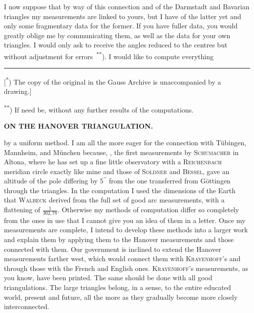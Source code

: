\par\noindent\hspace*{\parindent}I now suppose that by way of this connection and of the Darmstadt and Bavarian triangles my measurements are linked to yours, but I have  of the latter yet and only some fragmentary data for the former.
If you have fuller data, you would greatly oblige me by communicating them, as well as the data for your own triangles.
I would only ask to receive the angles reduced to the centres but without adjustment for errors~\textsuperscript{**}).
I would like to compute everything
\par\smallskip\noindent\rule{.24\textwidth}{.4pt}\par\smallskip
{\footnotesize
\noindent\hspace*{1.5em}[\textsuperscript{*}) The copy of the original in the Gauss Archive is unaccompanied by a drawing.]\par
\noindent\hspace*{1.5em}\textsuperscript{**}) If need be, without any further results of the computations.\par
}
\clearpage
\noindent\null\hfill{\small\textbf{ON THE HANOVER TRIANGULATION.}}\hfill{}\par\medskip
\noindent by a uniform method.
I am all the more eager for the connection with Tübingen, Mannheim, and München because, , the first measurements by \textsc{Schumacher} in Altona, where he has set up a fine little observatory with a \textsc{Reichenbach} meridian circle exactly like mine and those of \textsc{Soldner} and \textsc{Bessel}, gave an altitude of the pole differing by \(5^{\prime\prime}\) from the one transferred from Göttingen through the triangles.
In the computation I used the dimensions of the Earth that \textsc{Walbeck} derived from the full set of good arc measurements, with a flattening of \(\frac{1}{302{,}78}\).
Otherwise my methods of computation differ so completely from the ones in use that I cannot give you an idea of them in a letter.
Once my measurements are complete, I intend to develop these methods into a larger work and explain them by applying them to the Hanover measurements and those connected with them.
Our government is inclined to extend the Hanover measurements farther west, which would connect them with \textsc{Krayenhoff}'s and through those with the French and English ones.
\textsc{Krayenhoff}'s measurements, as you know, have been printed. The same should be done with all good triangulations. The large triangles belong, in a sense, to the entire educated world, present and future, all the more as they gradually become more closely interconnected.
